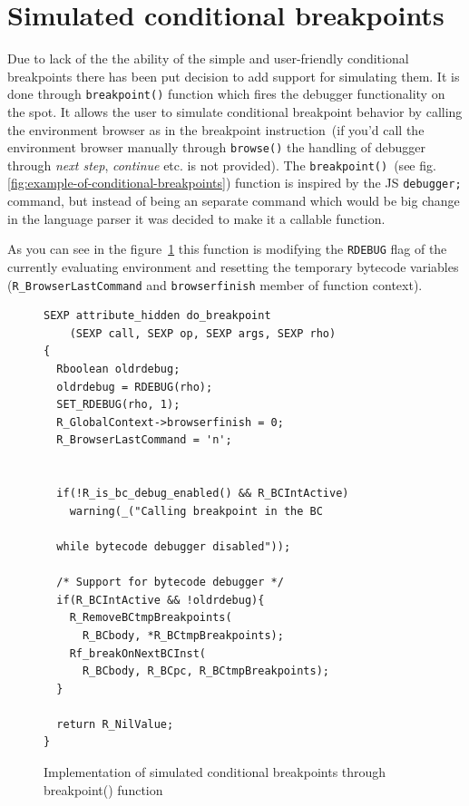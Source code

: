 \documentclass[thesis=M,english]{FITthesis}[2018/10/20]
\newcommand{\code}[1]{\texttt{#1}}
\begin{document}
\section{Simulated conditional breakpoints}\label{conditional-breakpoints}

Due to lack of the the ability of the simple and user-friendly conditional breakpoints there has been put decision to add support for simulating them. It is done through \code{breakpoint()} function which fires the debugger functionality on the spot. It allows the user to simulate conditional breakpoint behavior by calling the environment browser as in the breakpoint instruction~(if you'd call the environment browser manually through \code{browse()} the handling of debugger through \textit{next step}, \textit{continue} etc. is not provided). The \code{breakpoint()}~(see fig. \ref{fig:example-of-conditional-breakpoints}) function is inspired by the JS \code{debugger;} command, but instead of being an separate command which would be big change in the language parser it was decided to make it a callable function.

As you can see in the figure~\ref{fig:conditional-breakpoints-breakpoint} this function is modifying the \code{RDEBUG} flag of the currently evaluating environment and resetting the temporary bytecode variables (\code{R{\_}BrowserLastCommand} and \code{browserfinish} member of function context). 

\begin{figure}[h!]
\begin{lstlisting}
SEXP attribute_hidden do_breakpoint
	(SEXP call, SEXP op, SEXP args, SEXP rho)
{
  Rboolean oldrdebug;
  oldrdebug = RDEBUG(rho);
  SET_RDEBUG(rho, 1);
  R_GlobalContext->browserfinish = 0;
  R_BrowserLastCommand = 'n';


  if(!R_is_bc_debug_enabled() && R_BCIntActive)
    warning(_("Calling breakpoint in the BC 
  
  while bytecode debugger disabled"));

  /* Support for bytecode debugger */
  if(R_BCIntActive && !oldrdebug){
    R_RemoveBCtmpBreakpoints(
      R_BCbody, *R_BCtmpBreakpoints);
    Rf_breakOnNextBCInst(
      R_BCbody, R_BCpc, R_BCtmpBreakpoints);
  }

  return R_NilValue;
}
\end{lstlisting}
	\caption{Implementation of simulated conditional breakpoints through breakpoint() function}\label{fig:conditional-breakpoints-breakpoint}
\end{figure}
\end{document}
